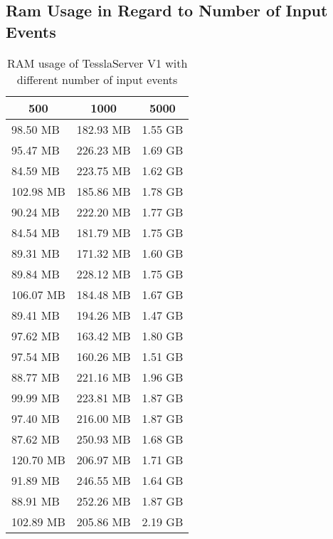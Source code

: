 \clearpage

\subsection{Ram Usage in Regard to Number of Input Events}
\label{sec:appendix:runtime_benchmark_data:ram_usage_events}

\begin{table}[!htb]
  \centering
  \caption{RAM usage of TesslaServer V1 with different number of input events}
  \label{table:tessla_server_v1_events_ram_usage_data}
  \begin{tabular}{lll}
    \multicolumn{1}{c}{500} & \multicolumn{1}{c}{1000} & \multicolumn{1}{c}{5000} \\ \hline
    98.50 MB  & 182.93 MB & 1.55 GB \\
    95.47 MB  & 226.23 MB & 1.69 GB \\
    84.59 MB  & 223.75 MB & 1.62 GB \\
    102.98 MB & 185.86 MB & 1.78 GB \\
    90.24 MB  & 222.20 MB & 1.77 GB \\
    84.54 MB  & 181.79 MB & 1.75 GB \\
    89.31 MB  & 171.32 MB & 1.60 GB \\
    89.84 MB  & 228.12 MB & 1.75 GB \\
    106.07 MB & 184.48 MB & 1.67 GB \\
    89.41 MB  & 194.26 MB & 1.47 GB \\
    97.62 MB  & 163.42 MB & 1.80 GB \\
    97.54 MB  & 160.26 MB & 1.51 GB \\
    88.77 MB  & 221.16 MB & 1.96 GB \\
    99.99 MB  & 223.81 MB & 1.87 GB \\
    97.40 MB  & 216.00 MB & 1.87 GB \\
    87.62 MB  & 250.93 MB & 1.68 GB \\
    120.70 MB & 206.97 MB & 1.71 GB \\
    91.89 MB  & 246.55 MB & 1.64 GB \\
    88.91 MB  & 252.26 MB & 1.87 GB \\
    102.89 MB & 205.86 MB & 2.19 GB
  \end{tabular}
\end{table}

